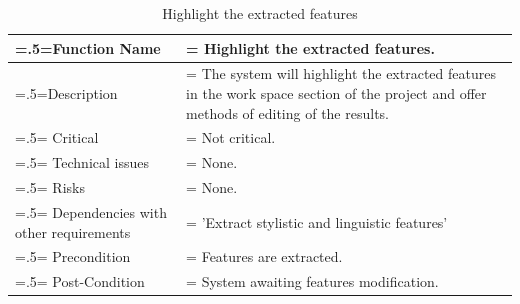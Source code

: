 \begin{center}
    \begin{table}[H]
        \caption{Highlight the extracted features}
        \begin{tabularx}{\textwidth} {
                | >{\raggedright\arraybackslash\hsize=.5\hsize\linewidth=\hsize}X
                | >{\raggedright\arraybackslash\hsize=1.5\hsize\linewidth=\hsize}X |}
            \hline
            Function Name                        & Highlight the extracted features.                                                                                                      \\ \hline
            Description                          & The system will highlight the extracted features in the work space section of the project and offer methods of editing of the results. \\ \hline
            Critical                             & Not critical.                                                                                                                          \\ \hline
            Technical issues                     & None.                                                                                                                                  \\ \hline
            Risks                                & None.                                                                                                                                  \\ \hline
            Dependencies with other requirements & 'Extract stylistic and linguistic features'                                                                                            \\ \hline
            Precondition                         & Features are extracted.                                                                                                                \\ \hline
            Post-Condition                       & System awaiting features modification.                                                                                                 \\ \hline
        \end{tabularx}
    \end{table}
\end{center}

